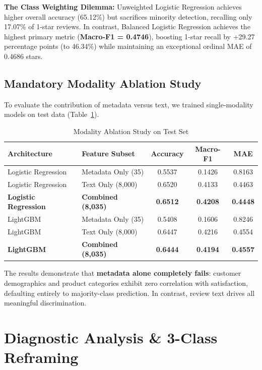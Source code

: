 \documentclass[conference]{IEEEtran}
\begin{document}
\textbf{The Class Weighting Dilemma:} Unweighted Logistic Regression achieves higher overall accuracy (65.12\%) but sacrifices minority detection, recalling only 17.07\% of 1-star reviews. In contrast, Balanced Logistic Regression achieves the highest primary metric (\textbf{Macro-F1 = 0.4746}), boosting 1-star recall by +29.27 percentage points (to 46.34\%) while maintaining an exceptional ordinal MAE of 0.4686 stars.

\subsection{Mandatory Modality Ablation Study}
To evaluate the contribution of metadata versus text, we trained single-modality models on test data (Table~\ref{tab:ablation}).

\begin{table}[htbp]
\caption{Modality Ablation Study on Test Set}
\label{tab:ablation}
\centering
\begin{tabular}{llccc}
\toprule
\textbf{Architecture} & \textbf{Feature Subset} & \textbf{Accuracy} & \textbf{Macro-F1} & \textbf{MAE} \\
\midrule
Logistic Regression & Metadata Only (35) & 0.5537 & 0.1426 & 0.8163 \\
Logistic Regression & Text Only (8,000) & 0.6520 & 0.4133 & 0.4463 \\
\textbf{Logistic Regression} & \textbf{Combined (8,035)} & \textbf{0.6512} & \textbf{0.4208} & \textbf{0.4448} \\
\midrule
LightGBM & Metadata Only (35) & 0.5408 & 0.1606 & 0.8246 \\
LightGBM & Text Only (8,000) & 0.6447 & 0.4216 & 0.4554 \\
\textbf{LightGBM} & \textbf{Combined (8,035)} & \textbf{0.6444} & \textbf{0.4194} & \textbf{0.4557} \\
\bottomrule
\end{tabular}
\end{table}

The results demonstrate that \textbf{metadata alone completely fails}: customer demographics and product categories exhibit zero correlation with satisfaction, defaulting entirely to majority-class prediction. In contrast, review text drives all meaningful discrimination.

\section{Diagnostic Analysis \& 3-Class Reframing}
\end{document}
